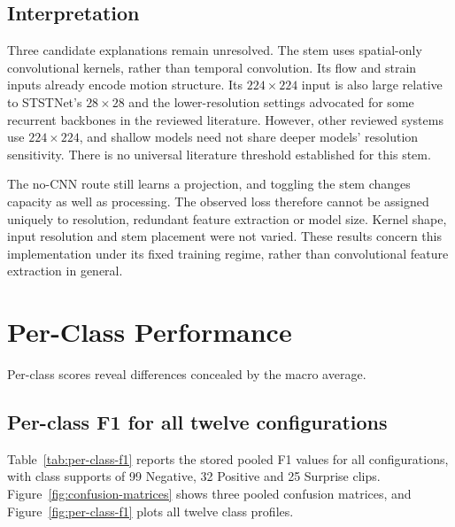 \subsection{Interpretation}
\label{sec:cnn-interpretation-result}

Three candidate explanations remain unresolved. The stem uses spatial-only convolutional kernels, rather than temporal convolution. Its flow and strain inputs already encode motion structure. Its $224\times224$ input is also large relative to STSTNet's $28\times28$ and the lower-resolution settings advocated for some recurrent backbones in the reviewed literature. However, other reviewed systems use $224\times224$, and shallow models need not share deeper models' resolution sensitivity. There is no universal literature threshold established for this stem.

The no-CNN route still learns a projection, and toggling the stem changes capacity as well as processing. The observed loss therefore cannot be assigned uniquely to resolution, redundant feature extraction or model size. Kernel shape, input resolution and stem placement were not varied. These results concern this implementation under its fixed training regime, rather than convolutional feature extraction in general.

\section{Per-Class Performance}
\label{sec:per-class}

Per-class scores reveal differences concealed by the macro average.

\subsection{Per-class F1 for all twelve configurations}
\label{sec:per-class-table}

Table~\ref{tab:per-class-f1} reports the stored pooled F1 values for all configurations, with class supports of 99 Negative, 32 Positive and 25 Surprise clips. Figure~\ref{fig:confusion-matrices} shows three pooled confusion matrices, and Figure~\ref{fig:per-class-f1} plots all twelve class profiles.

